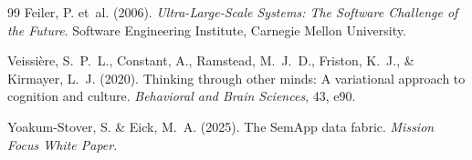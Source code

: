 \documentclass[11pt,a4paper]{article}
\theoremstyle{definition}
\newcommand{\bp}{p}
\begin{document}
\begin{thebibliography}{99}
Feiler, P. et~al. (2006).
\newblock \emph{Ultra-Large-Scale Systems: The Software Challenge of the Future}.
\newblock Software Engineering Institute, Carnegie Mellon University.

Veissi\`{e}re, S.~P.~L., Constant, A., Ramstead, M.~J.~D., Friston, K.~J., \& Kirmayer, L.~J. (2020).
\newblock Thinking through other minds: A variational approach to cognition and culture.
\newblock \emph{Behavioral and Brain Sciences}, 43, e90.

Yoakum-Stover, S. \& Eick, M.~A. (2025).
\newblock The {SemApp} data fabric.
\newblock \emph{Mission Focus White Paper}.



\end{thebibliography}






\end{document}
